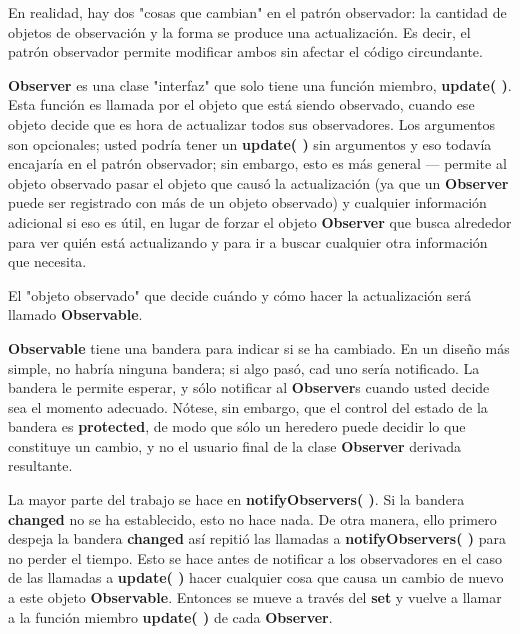 \documentclass{article}
\begin{document}
En realidad, hay dos "cosas que cambian" en el patrón observador: la cantidad de objetos de observación y la forma se produce una actualización. Es decir, el patrón observador permite modificar ambos sin afectar el código circundante.


\-\-\-\-\-\-\-\-\-\-\-\-\-  \newline

\textbf{Observer} es una clase "interfaz" que solo tiene una función miembro, \textbf{update( )}. Esta función es llamada por el objeto que está siendo observado, cuando ese objeto decide que es hora de actualizar todos sus observadores. Los argumentos son opcionales; usted podría tener un \textbf{update( )} sin argumentos y eso todavía encajaría en el patrón observador; sin embargo, esto es más general — permite al objeto observado pasar el objeto que causó la actualización (ya que un \textbf{Observer} puede ser registrado con más de un objeto observado) y cualquier información adicional si eso es útil, en lugar de forzar el objeto \textbf{Observer} que busca alrededor para ver quién está actualizando y para ir a buscar cualquier otra información que necesita.    \newline

El "objeto observado" que decide cuándo y cómo hacer la actualización será llamado \textbf{Observable}.   \newline

\textbf{Observable} tiene una bandera para indicar si se ha cambiado. En un diseño más simple, no habría ninguna bandera; si algo pasó, cad uno sería notificado. La bandera le permite esperar, y sólo notificar al \textbf{Observer}s cuando usted decide sea el momento adecuado. Nótese, sin embargo, que el control del estado de la bandera es \textbf{protected}, de modo que sólo un heredero puede decidir lo que constituye un cambio, y no el usuario final de la clase \textbf{Observer} derivada resultante.  \newline

La mayor parte del trabajo se hace en \textbf{notifyObservers( )}. Si la bandera \textbf{changed} no se ha establecido, esto no hace nada. De otra manera, ello primero despeja la bandera \textbf{changed} así repitió las llamadas a \textbf{notifyObservers( )} para no perder el tiempo. Esto se hace antes de notificar a los observadores en el caso de las llamadas a \textbf{update( )} hacer cualquier cosa que causa un cambio de nuevo a este objeto \textbf{Observable}. Entonces se mueve a través del \textbf{set} y vuelve a llamar a la función miembro \textbf{update( )} de cada \textbf{Observer}.   \newline
\end{document}
